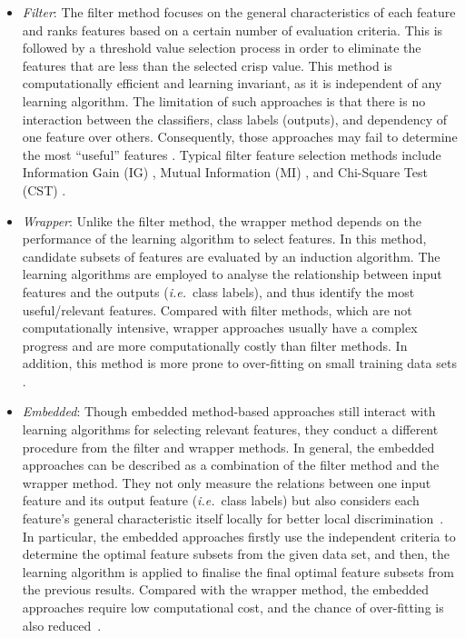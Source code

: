 \documentclass{article}
\newcommand{\zzie}{\emph{i.e.}~}
\newcommand*{\1}{\textcolor{magenta}}
\begin{document}
	\begin{itemize}
		\item \textit{Filter}: The filter method focuses on the general characteristics of each feature and ranks features based on a certain number of evaluation criteria. This is followed by a threshold value selection process in order to eliminate the features that are less than the selected crisp value. This method is computationally efficient and learning invariant, as it is independent of any learning algorithm. The limitation of such approaches is that there is no interaction between the classifiers, class labels (outputs), and dependency of one feature over others. Consequently, those approaches may fail to determine the most ``useful'' features \cite{liang2017text}. Typical filter feature selection methods include Information Gain (IG) \cite{azhagusundari2013ig}, Mutual Information (MI) \cite{amiri2011mi, pohjalainen2015feature}, and Chi-Square Test (CST) \cite{saengsiri2010cst}.
		\item \textit{Wrapper}: Unlike the filter method, the wrapper method depends on the performance of the learning algorithm to select features. In this method, candidate subsets of features are evaluated by an induction algorithm. The learning algorithms are employed to analyse the relationship between input features and the outputs (\zzie class labels), and thus identify the most useful/relevant features. Compared with filter methods, which are not computationally intensive, wrapper approaches usually have a complex progress and are more computationally costly than filter methods. In addition, this method is more prone to over-fitting on small training data sets \cite{liang2017text}.
		\item \textit{Embedded}: Though embedded method-based approaches still interact with learning algorithms for selecting relevant features, they conduct a different procedure from the filter and wrapper methods. In general, the embedded approaches can be described as a combination of the filter method and the wrapper method. They not only measure the relations between one input feature and its output feature (\zzie class labels) but also considers each feature's general characteristic itself locally for better local discrimination~\cite{ang2015supervised}. In particular, the embedded approaches firstly use the independent criteria to determine the optimal feature subsets from the given data set, and then, the learning algorithm is applied to finalise the final optimal feature subsets from the previous results. Compared with the wrapper method, the embedded approaches require low computational cost, and the chance of over-fitting is also reduced~\cite{ang2015supervised}. 
	\end{itemize}
	
\end{document}
